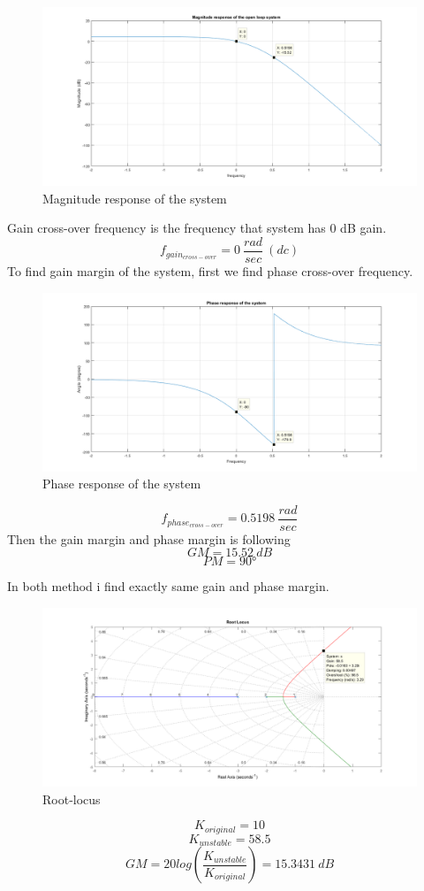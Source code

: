 \documentclass[11pt]{report}
\begin{document}
\begin{figure}[H]
  \includegraphics[scale=0.7, center]{magnitude_response}
  \caption{Magnitude response of the system}
  \label{fig:zero}
\end{figure}
Gain cross-over frequency is the frequency that system has 0 dB gain. 
\[f_{gain_{cross-over}}= 0\> \frac{rad}{sec} \> (dc)\]
To find gain margin of the system, first we find phase cross-over frequency.
\begin{figure}[H]
  \includegraphics[scale=0.7, center]{phase_response}
  \caption{Phase response of the system}
  \label{fig:zero}
\end{figure}
\[f_{phase_{cross-over}}= 0.5198 \> \frac{rad}{sec}\]
Then the gain margin and phase margin is following
\[GM=15.52 \> dB\]
\[PM=\ang{90}\]

In both method i find exactly same gain and phase margin. 
\begin{figure}[H]
  \includegraphics[scale=0.7, center]{rlocus}
  \caption{Root-locus}
  \label{fig:zero}
\end{figure}
\[K_{original}=10\]
\[K_{unstable}=58.5\]
\[GM = 20log(\frac{K_{unstable}}{K_{original}})=15.3431 \> dB\]
\end{document}
